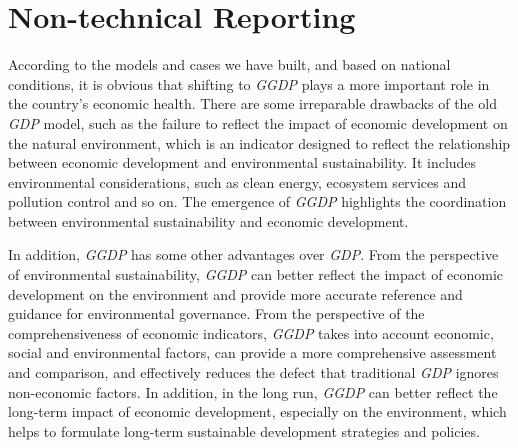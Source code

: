 \documentclass[12pt]{article}
\begin{document}
\begin{abstract}
	The \textbf{GM(1,1)} is used for short-term prediction of the above data, and the results show that the growth decay rate of \textit{GGDP} is significantly lower than \textit{GDP} under the calculation method of \textit{GDP}.
	This shows that the introduction of the \textit{GGDP} accounting method can digitize the economic growth rate and thus improve the economic performance.
	This is a great support for the sustainability and rationality of economic development.
	
	Finally, we carried out \textbf{Sensitivity Analysis} and \textbf{Optimization Improvement} on the relevant models, and found that the \textbf{Binary Linear Regression} error value is extremely low, which fully demonstrates the reliability and applicability of the model.
	And the results also have great application value.
		
	\vspace{5pt}
	\textbf{Keywords}: Green GDP(\textit{GGDP}), EWM, AHP, TOPSIS, Grey System, Multiple Linear Regression, ARIMA, RANSAC, \LaTeX.
		
	\end{abstract}
	\maketitle  %
	\tableofcontents  %
	\section{Non-technical Reporting} %
	
	According to the models and cases we have built, and based on national conditions, it is obvious that shifting to \textit{GGDP} plays a more important role in the country's economic health.
	There are some irreparable drawbacks of the old \textit{GDP} model, such as the failure to reflect the impact of economic development on the natural environment, which is an indicator designed to reflect the relationship between economic development and environmental sustainability.
	It includes environmental considerations, such as clean energy, ecosystem services and pollution control and so on.
	The emergence of \textit{GGDP} highlights the coordination between environmental sustainability and economic development.
	
	In addition, \textit{GGDP} has some other advantages over \textit{GDP}.
	From the perspective of environmental sustainability, \textit{GGDP} can better reflect the impact of economic development on the environment and provide more accurate reference and guidance for environmental governance.
	From the perspective of the comprehensiveness of economic indicators, \textit{GGDP} takes into account economic, social and environmental factors, can provide a more comprehensive assessment and comparison, and effectively reduces the defect that traditional \textit{GDP} ignores non-economic factors.
	In addition, in the long run, \textit{GGDP} can better reflect the long-term impact of economic development, especially on the environment, which helps to formulate long-term sustainable development strategies and policies.
	
\end{document}
